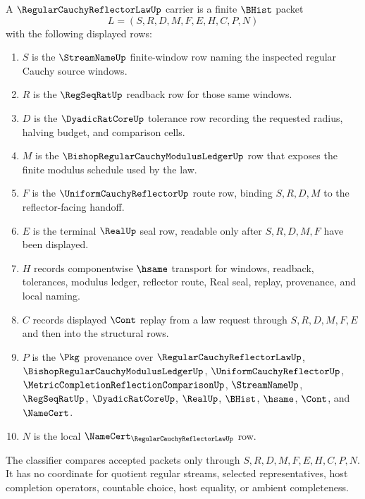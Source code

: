 \begin{definition}
\label{def:regular-cauchy-reflector-law-carrier}
A $\RegularCauchyReflectorLawUp$ carrier is a finite $\BHist$ packet
$$
L=(S,R,D,M,F,E,H,C,P,N)
$$
with the following displayed rows:
\begin{enumerate}
\item $S$ is the $\StreamNameUp$ finite-window row naming the inspected regular Cauchy source windows.
\item $R$ is the $\RegSeqRatUp$ readback row for those same windows.
\item $D$ is the $\DyadicRatCoreUp$ tolerance row recording the requested radius, halving budget, and comparison cells.
\item $M$ is the $\BishopRegularCauchyModulusLedgerUp$ row that exposes the finite modulus schedule used by the law.
\item $F$ is the $\UniformCauchyReflectorUp$ route row, binding $S,R,D,M$ to the reflector-facing handoff.
\item $E$ is the terminal $\RealUp$ seal row, readable only after $S,R,D,M,F$ have been displayed.
\item $H$ records componentwise $\hsame$ transport for windows, readback, tolerances, modulus ledger, reflector route, Real seal, replay, provenance, and local naming.
\item $C$ records displayed $\Cont$ replay from a law request through $S,R,D,M,F,E$ and then into the structural rows.
\item $P$ is the $\Pkg$ provenance over $\RegularCauchyReflectorLawUp$, $\BishopRegularCauchyModulusLedgerUp$, $\UniformCauchyReflectorUp$, $\MetricCompletionReflectionComparisonUp$, $\StreamNameUp$, $\RegSeqRatUp$, $\DyadicRatCoreUp$, $\RealUp$, $\BHist$, $\hsame$, $\Cont$, and $\NameCert$.
\item $N$ is the local $\NameCert_{\RegularCauchyReflectorLawUp}$ row.
\end{enumerate}
The classifier compares accepted packets only through $S,R,D,M,F,E,H,C,P,N$. It has no coordinate for quotient regular streams, selected representatives, host completion operators, countable choice, host equality, or ambient completeness.
\end{definition}

